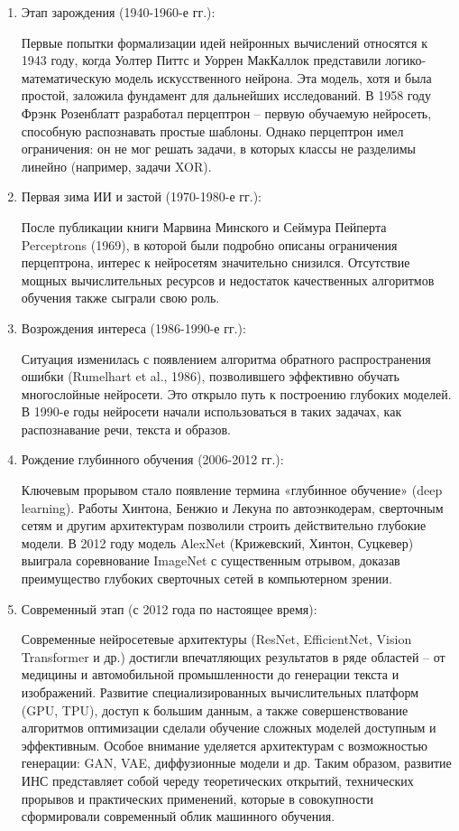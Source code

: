 \begin{enumerate}
	\item Этап зарождения (1940-1960-е гг.):
	
	Первые попытки формализации идей нейронных вычислений относятся к 1943 году, когда Уолтер Питтс и Уоррен МакКаллок представили логико-математическую модель искусственного нейрона. Эта модель, хотя и была простой, заложила фундамент для дальнейших исследований. В 1958 году Фрэнк Розенблатт разработал перцептрон – первую обучаемую нейросеть, способную распознавать простые шаблоны. Однако перцептрон имел ограничения: он не мог решать задачи, в которых классы не разделимы линейно (например, задачи XOR).
	
	\item Первая зима ИИ и застой (1970-1980-е гг.):
	
	После публикации книги Марвина Минского и Сеймура Пейперта Perceptrons (1969), в которой были подробно описаны ограничения перцептрона, интерес к нейросетям значительно снизился. Отсутствие мощных вычислительных ресурсов и недостаток качественных алгоритмов обучения также сыграли свою роль.
	
	\item Возрождения интереса (1986-1990-е гг.):
	
	Ситуация изменилась с появлением алгоритма обратного распространения ошибки (Rumelhart et al., 1986), позволившего эффективно обучать многослойные нейросети. Это открыло путь к построению глубоких моделей. В 1990-е годы нейросети начали использоваться в таких задачах, как распознавание речи, текста и образов.
	
	\item Рождение глубинного обучения (2006-2012 гг.):
	
	Ключевым прорывом стало появление термина «глубинное обучение» (deep learning). Работы Хинтона, Бенжио и Лекуна по автоэнкодерам, сверточным сетям и другим архитектурам позволили строить действительно глубокие модели. В 2012 году модель AlexNet (Крижевский, Хинтон, Суцкевер) выиграла соревнование ImageNet с существенным отрывом, доказав преимущество глубоких сверточных сетей в компьютерном зрении.
	
	\item Современный этап (с 2012 года по настоящее время):
	
	Современные нейросетевые архитектуры (ResNet, EfficientNet, Vision Transformer и др.) достигли впечатляющих результатов в ряде областей – от медицины и автомобильной промышленности до генерации текста и изображений. Развитие специализированных вычислительных платформ (GPU, TPU), доступ к большим данным, а также совершенствование алгоритмов оптимизации сделали обучение сложных моделей доступным и эффективным. Особое внимание уделяется архитектурам с возможностью генерации: GAN, VAE, диффузионные модели и др.
	Таким образом, развитие ИНС представляет собой череду теоретических открытий, технических прорывов и практических применений, которые в совокупности сформировали современный облик машинного обучения.
	
\end{enumerate}

